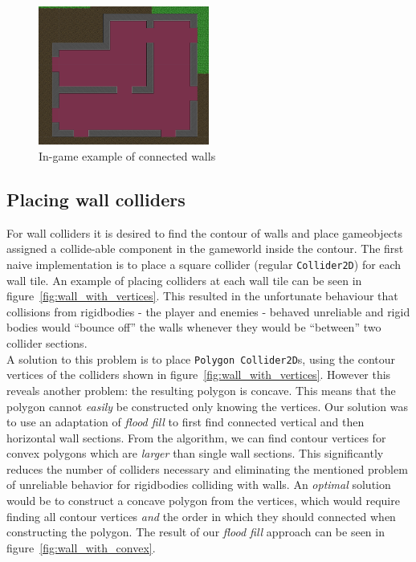 \begin{figure}[H]
    \centering
    \includegraphics[width=0.5\textwidth]{figures/generating_levels/walls_ingame.png}
    \caption{In-game example of connected walls}\label{fig:walls_ingame} 
\end{figure}

\subsection{Placing wall colliders}
For wall colliders it is desired to find the contour of walls and place gameobjects assigned a collide-able component in the gameworld inside the contour.
The first naive implementation is to place a square collider (regular \texttt{Collider2D}) for each wall tile.
An example of placing colliders at each wall tile can be seen in figure~\ref{fig:wall_with_vertices}.
This resulted in the unfortunate behaviour that collisions from rigidbodies - the player and enemies - behaved unreliable and rigid bodies would ``bounce off'' the walls whenever they would be ``between'' two collider sections.
\\
A solution to this problem is to place \texttt{Polygon Collider2D}s, using the contour vertices of the colliders shown in figure~\ref{fig:wall_with_vertices}. 
However this reveals another problem: the resulting polygon is concave.
This means that the polygon cannot \textit{easily} be constructed only knowing the vertices.
Our solution was to use an adaptation of \textit{flood fill} to first find connected vertical and then horizontal wall sections.
From the algorithm, we can find contour vertices for convex polygons which are \textit{larger} than single wall sections.
This significantly reduces the number of colliders necessary and eliminating the mentioned problem of unreliable behavior for rigidbodies colliding with walls.
An \textit{optimal} solution would be to construct a concave polygon from the vertices, which would require finding all
contour vertices \textit{and} the order in which they should connected when constructing the polygon.
The result of our \textit{flood fill} approach can be seen in figure~\ref{fig:wall_with_convex}.

